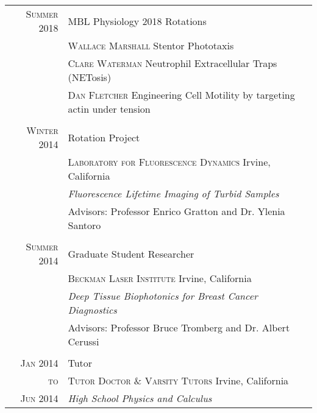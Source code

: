 \documentclass[letterpaper,10pt]{article} %
\begin{document}
\begin{tabularx}{\textwidth}{r|p{11cm}}



\textsc{Summer 2018} & MBL Physiology 2018 Rotations\\
& \textsc{Wallace Marshall} Stentor Phototaxis\\
& \textsc{Clare Waterman} Neutrophil Extracellular Traps (NETosis)\\
& \textsc{Dan Fletcher} Engineering Cell Motility by targeting actin under tension \\

\multicolumn{2}{c}{} \\


\textsc{Winter 2014} & Rotation Project \\
& \textsc{Laboratory for Fluorescence Dynamics} Irvine, California\\
&\emph{Fluorescence Lifetime Imaging of Turbid Samples}\\
& Advisors: Professor Enrico Gratton and Dr. Ylenia Santoro \\

\multicolumn{2}{c}{} \\


\textsc{Summer 2014} & Graduate Student Researcher \\
& \textsc{Beckman Laser Institute} Irvine, California\\
&\emph{Deep Tissue Biophotonics for Breast Cancer Diagnostics}\\ 
& Advisors: Professor Bruce Tromberg and Dr. Albert Cerussi \\

\multicolumn{2}{c}{} \\


\textsc{Jan 2014} & Tutor \\
\textsc{to} & \textsc{Tutor Doctor \& Varsity Tutors} Irvine, California\\
\textsc{Jun 2014} &\emph{High School Physics and Calculus}\\ 


\end{tabularx}
\end{document}

